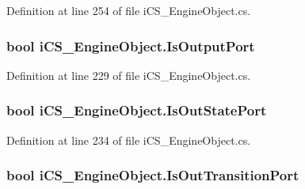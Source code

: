 Definition at line 254 of file i\+C\+S\+\_\+\+Engine\+Object.\+cs.

\hypertarget{classi_c_s___engine_object_ab8ad56bcc05125043e7a350d209163e7}{
\subsubsection[{Is\+Output\+Port}]{\setlength{\rightskip}{0pt plus 5cm}bool i\+C\+S\+\_\+\+Engine\+Object.\+Is\+Output\+Port\hspace{0.3cm}{\ttfamily [get]}}}\label{classi_c_s___engine_object_ab8ad56bcc05125043e7a350d209163e7}


Definition at line 229 of file i\+C\+S\+\_\+\+Engine\+Object.\+cs.

\hypertarget{classi_c_s___engine_object_aad6cf06ffce7d78fe774671ef3ba4e55}{
\subsubsection[{Is\+Out\+State\+Port}]{\setlength{\rightskip}{0pt plus 5cm}bool i\+C\+S\+\_\+\+Engine\+Object.\+Is\+Out\+State\+Port\hspace{0.3cm}{\ttfamily [get]}}}\label{classi_c_s___engine_object_aad6cf06ffce7d78fe774671ef3ba4e55}


Definition at line 234 of file i\+C\+S\+\_\+\+Engine\+Object.\+cs.

\hypertarget{classi_c_s___engine_object_a6d380de88c6bfb1df3f3721b2ad3daeb}{
\subsubsection[{Is\+Out\+Transition\+Port}]{\setlength{\rightskip}{0pt plus 5cm}bool i\+C\+S\+\_\+\+Engine\+Object.\+Is\+Out\+Transition\+Port\hspace{0.3cm}{\ttfamily [get]}}}\label{classi_c_s___engine_object_a6d380de88c6bfb1df3f3721b2ad3daeb}


